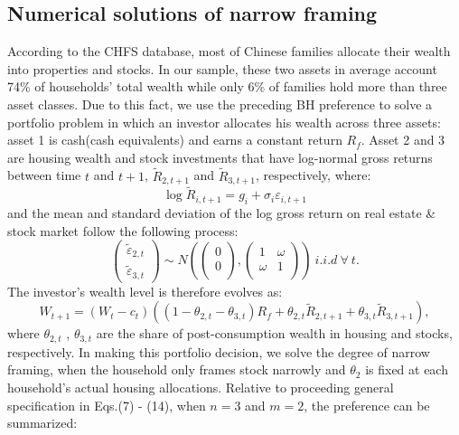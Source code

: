 \documentclass[ukenglish,nottitlepage,thmsb,11pt,letterpaper]{article}
\begin{document}
\subsection{Numerical solutions of narrow framing}
According to the CHFS database, most of Chinese families allocate their wealth into properties and stocks. In our sample, these two assets in average account  74\% of households' total wealth while only 6\% of families hold more than three asset classes. Due to this fact, we use the preceding BH preference to solve a portfolio problem in which an investor allocates his wealth across three assets: asset 1 is cash(cash equivalents) and earns a constant return $R_f$. Asset 2 and 3 are housing wealth and stock investments that have log-normal gross returns between time $t$ and $t+1$, $\widetilde{R}_{2,t+1}$ and  $\widetilde{R}_{3,t+1}$, respectively, where:
\begin{equation*}
\log\widetilde{R}_{i,t+1} = g_i + \sigma_i \varepsilon_{i,t+1}
\end{equation*}
and the mean and standard deviation of the log gross return on real estate \& stock market follow the following process:
\begin{equation}
\left(
\begin{array}{ccc}
\widetilde{\varepsilon}_{2,t}\\
\widetilde{\varepsilon}_{3,t}
\end{array}
\right)
\sim N
\left( \left(
\begin{array}{ccc}
0\\
0\\
\end{array}
\right)
,
\left(
\begin{array}{ccc}
1 & \omega\\
\omega & 1\\
\end{array}
\right)  \right) \ i.i.d \ \forall \  t.
\end{equation}
The investor's wealth level is therefore evolves as:
\begin{equation}
W_{t+1} = (W_t -c_t) \left((1-\theta_{2,t} - \theta_{3,t}) R_f + \theta_{2,t} \widetilde{R}_{2,t+1} + \theta_{3,t}  \widetilde{R}_{3,t+1}\right),
\end{equation}
where $ \theta_{2,t}$ , $ \theta_{3,t}$ are the share of post-consumption wealth in housing and stocks, respectively.  
In making this portfolio decision, we solve the degree of narrow framing, when the household only frames stock  narrowly and $\theta_2$ is fixed at each household's actual housing allocations. Relative to proceeding  general specification in Eqs.(7) - (14), when $n = 3$ and $m =2$, the preference can be summarized:
\end{document}

